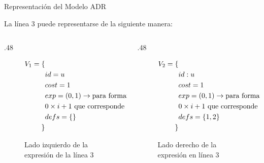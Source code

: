 \begin{frame}[fragile]{Representación del Modelo ADR}

La línea 3 puede representarse de la siguiente manera:

\begin{columns}
  \begin{column}{.48\textwidth}
    \begin{figure}
      \scriptsize
      \begin{equation*}
        \begin{split}
        V_1 = \{ \\
        & id = u \\
        & cost = 1 \\
        & exp = (0, 1) \rightarrow {\color{black}\text{para formar la expresión }} \\
        & 0 \times i + 1 {\color{black}\text{ que corresponde a }} u[1]\\
        & defs = \{\} \\
        \}
          \end{split}
      \end{equation*}
      \captionsetup{font=scriptsize}
      \caption{Lado izquierdo de la expresión de la línea 3}
    \end{figure}
  \end{column}

  \begin{column}{.48\textwidth}
    \begin{figure}
      \scriptsize
      \begin{equation*}
        \begin{split}
          V_2 = \{ \\
          & id:u \\
          & cost = 1 \\
          & exp = (0, 1) \rightarrow {\color{black}\text{para formar la expresión }} \\
          & 0 \times i + 1 {\color{black}\text{ que corresponde a }} u[1]\\
          & defs = \{1, 2\} \\
          \}
        \end{split}
      \end{equation*}
      \captionsetup{font=scriptsize}
      \caption{Lado derecho de la expresión en línea 3}
    \end{figure}
  \end{column}
\end{columns}
\end{frame}



